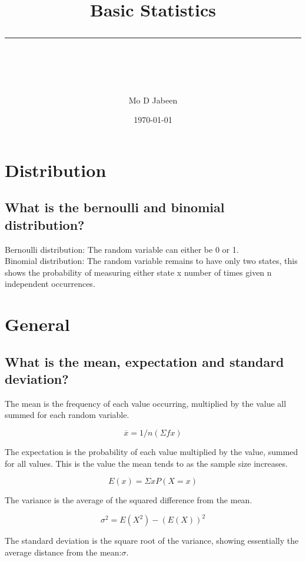 \documentclass[11pt]{scrartcl} %
\title{	
	\normalfont\normalsize
	\vspace{20pt} %
	{\huge Basic Statistics}\\ %
	\vspace{12pt} %
	\rule{\linewidth}{2pt}\\ %
}
\author{\small Mo D Jabeen} %
\date{\normalsize\today} %
\begin{document}
\maketitle %

\section{Distribution}

\subsection{What is the bernoulli and binomial distribution?}

Bernoulli distribution: The random variable can either be 0 or 1.\\

Binomial distribution: The random variable remains to have only two
states, this shows the probability of measuring either state x number of
times given n independent occurrences.

\section{General}

\subsection{What is the mean, expectation and standard
deviation?}

The mean is the frequency of each value occurring, multiplied by the
value all summed for each random variable.

\begin{equation}
	\overline{x} = 1/n(\Sigma fx)
\end{equation}

The expectation is the probability of each value multiplied by the
value, summed for all values. This is the value the mean tends to as the
sample size increases.

\begin{equation}
	E(x) = \Sigma x P(X=x)
\end{equation}

The variance is the average of the squared difference from the mean.

\begin{equation}
	\sigma^2 = E(X^2) - (E(X))^2
\end{equation}

The standard deviation is the square root of the variance, showing
essentially the average distance from the mean:\(\sigma\). \\
\end{document}

